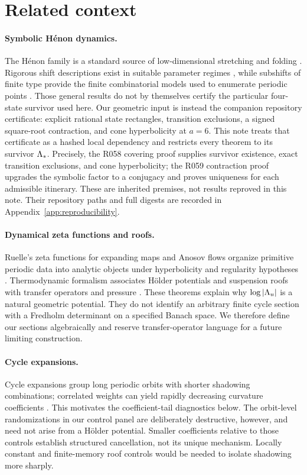 \section{Related context}
\label{sec:related}

\paragraph{Symbolic H\'enon dynamics.}
The H\'enon family is a standard source of low-dimensional stretching and
folding \citep{Henon1976}.  Rigorous shift descriptions exist in suitable
parameter regimes \citep{DevaneyNitecki1979}, while subshifts of finite type
provide the finite combinatorial models used to enumerate periodic points
\citep{LindMarcus1995}.  Those general results do not by themselves certify
the particular four-state survivor used here.  Our geometric input is instead
the companion repository certificate: explicit rational state rectangles,
transition exclusions, a signed square-root contraction, and cone
hyperbolicity at \(a=6\).  This note treats that certificate as a hashed local
dependency and restricts every theorem to its survivor \(\Lambda_*\).
Precisely, the R058 covering proof supplies survivor existence, exact
transition exclusions, and cone hyperbolicity; the R059 contraction proof
upgrades the symbolic factor to a conjugacy and proves uniqueness for each
admissible itinerary.  These are inherited premises, not results reproved in
this note.  Their repository paths and full digests are recorded in
Appendix~\ref{app:reproducibility}.

\paragraph{Dynamical zeta functions and roofs.}
Ruelle's zeta functions for expanding maps and Anosov flows organize primitive
periodic data into analytic objects under hyperbolicity and regularity
hypotheses \citep{Ruelle1976}.  Thermodynamic formalism associates H\"older
potentials and suspension roofs with transfer operators and pressure
\citep{Bowen1975,Ruelle1978}.  These theorems explain why
\(\log\left|\Lambda_u\right|\) is a natural geometric potential.  They do not
identify an arbitrary finite cycle section with a Fredholm determinant on a
specified Banach space.  We therefore define our sections algebraically and
reserve transfer-operator language for a future limiting construction.

\paragraph{Cycle expansions.}
Cycle expansions group long periodic orbits with shorter shadowing
combinations; correlated weights can yield rapidly decreasing curvature
coefficients \citep{ArtusoAurellCvitanovic1990}.  This motivates the
coefficient-tail diagnostics below.  The orbit-level randomizations in our
control panel are deliberately destructive, however, and need not arise from a
H\"older potential.  Smaller coefficients relative to those controls establish
structured cancellation, not its unique mechanism.  Locally constant and
finite-memory roof controls would be needed to isolate shadowing more sharply.

